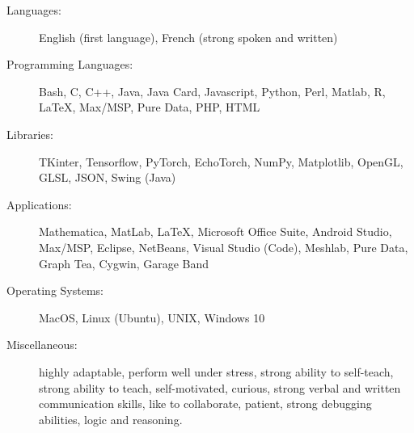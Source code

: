 \documentclass[letterpaper,11pt]{article}
\begin{document}
\begin{description}
\item[Languages:]
English (first language), French (strong spoken and written)

\item[Programming Languages:]
Bash, C, C++, Java, Java Card, Javascript, Python, Perl, Matlab, R, \LaTeX, Max/MSP, Pure Data, PHP, HTML

\item[Libraries:]
TKinter, Tensorflow, PyTorch, EchoTorch, NumPy, Matplotlib, OpenGL, GLSL, JSON, Swing (Java)

\item[Applications:]
Mathematica, MatLab, \LaTeX, Microsoft Office Suite, Android Studio, Max/MSP, Eclipse, NetBeans, Visual Studio (Code), Meshlab, Pure Data, Graph Tea, Cygwin, Garage Band

\item[Operating Systems:]
MacOS, Linux (Ubuntu), UNIX, Windows 10

\item[Miscellaneous:]
highly adaptable, perform well under stress, strong ability to self-teach, strong ability to teach, self-motivated, curious, strong verbal and written communication skills, like to collaborate, patient, strong debugging abilities, logic and reasoning.
\end{description}

\newpage
\end{document}
